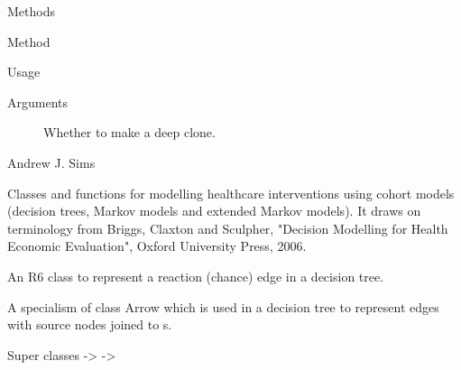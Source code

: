 \documentclass[a4paper]{book}
\begin{document}
\begin{Section}{Methods}
\begin{SubSection}{Method }
\begin{SubSubSection}{Usage}
\end{SubSubSection}


%
\begin{SubSubSection}{Arguments}

\begin{description}

\item[] Whether to make a deep clone.

\end{description}


\end{SubSubSection}

\end{SubSection}

\end{Section}
%
\begin{Author}\relax
Andrew J. Sims 
\end{Author}
%
\begin{Description}\relax
Classes and functions for modelling healthcare interventions using
cohort models (decision trees, Markov models and extended Markov models).
It draws on terminology from Briggs, Claxton and Sculpher, "Decision
Modelling for Health Economic Evaluation", Oxford University Press, 2006.
\end{Description}
%
\begin{Description}\relax
An R6 class to represent a reaction (chance) edge in a decision tree.
\end{Description}
%
\begin{Details}\relax
A specialism of class Arrow which is used in a decision tree to
represent edges with source nodes joined to s.
\end{Details}
%
\begin{Section}{Super classes}
 ->  -> 
\end{Section}
%
\end{document}

